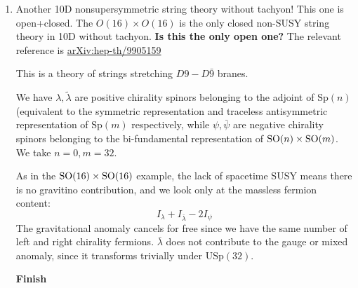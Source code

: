 \documentclass[11pt, class=article, crop=false]{standalone}
\begin{document}
\begin{enumerate}
	\item Another 10D nonsupersymmetric string theory without tachyon! This one is open+closed. The $O(16) \times O(16)$ is the only closed non-SUSY string theory in 10D without tachyon. \textbf{Is this the only open one?} The relevant reference is \href{https://arxiv.org/abs/hep-th/9905159}{arXiv:hep-th/9905159}
	
	This is a theory of strings stretching $D9-D\bar 9$ branes.
	
	We have $\lambda, \tilde \lambda$ are positive chirality spinors belonging to the adjoint of $\mathrm{Sp}(n)$ (equivalent to the symmetric representation {\tiny {}} and traceless antisymmetric representation {\tiny {}} of $\mathrm{Sp}(m)$ respectively, while $\psi, \bar \psi$ are negative chirality spinors belonging to the bi-fundamental representation of $\mathrm{SO}(n) \times \mathrm{SO}(m)$. We take $n=0, m = 32$.
	
	As in the $\mathrm{SO}(16) \times \mathrm{SO}(16)$ example, the lack of spacetime SUSY means there is no gravitino contribution, and we look only at the massless fermion content:
	\[
		I_{\lambda} + I_{\bar \lambda} - 2 I_{\psi}
	\]
	The gravitational anomaly cancels for free since we have the same number of left and right chirality fermions. $\bar \lambda$ does not contribute to the gauge or mixed anomaly, since it transforms trivially under $\mathrm{USp}(32)$. 
	
	\textbf{Finish}
	
	
\end{enumerate}
	
\end{document}

